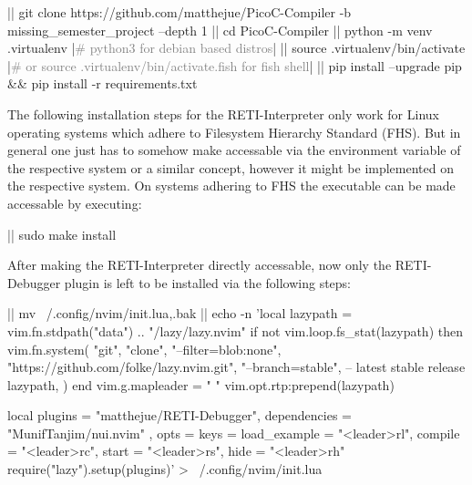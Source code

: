 \documentclass{report}
\begin{document}
\begin{terminal}
|\prompt| git clone https://github.com/matthejue/PicoC-Compiler
   -b missing_semester_project --depth 1
|\prompt| cd PicoC-Compiler
|\prompt| python -m venv .virtualenv |\textcolor{gray}{# python3 for debian based distros}|
|\prompt| source .virtualenv/bin/activate
|\textcolor{gray}{# or source .virtualenv/bin/activate.fish for fish shell}|
|\prompt| pip install --upgrade pip && pip install -r requirements.txt
\end{terminal}

The following installation steps for the RETI-Interpreter only work for Linux operating systems which adhere to \alert{Filesystem Hierarchy Standard} (FHS). But in general one just has to somehow make  accessable via the  environment variable of the respective system or a similar concept, however it might be implemented on the respective system. On systems adhering to FHS the executable can be made accessable by executing:

\begin{terminal}
  |\prompt| sudo make install
\end{terminal}

After making the RETI-Interpreter directly accessable, now only the RETI-Debugger plugin is left to be installed via the following steps:

\begin{terminal}
  |\prompt| mv ~/.config/nvim/init.lua{,.bak}
  |\prompt| echo -n 'local lazypath = vim.fn.stdpath("data") .. "/lazy/lazy.nvim"
  if not vim.loop.fs_stat(lazypath) then
    vim.fn.system({
      "git",
      "clone",
      "--filter=blob:none",
      "https://github.com/folke/lazy.nvim.git",
      "--branch=stable", -- latest stable release
      lazypath,
    })
  end
  vim.g.mapleader = " "
  vim.opt.rtp:prepend(lazypath)
\end{terminal}
\begin{terminal}
  local plugins = {
    {
      "matthejue/RETI-Debugger",
      dependencies = { "MunifTanjim/nui.nvim" },
      opts = {
          keys = {
            load_example = "<leader>rl",
            compile = "<leader>rc",
            start = "<leader>rs",
            hide = "<leader>rh"
          }
      }
    }
  }
  require("lazy").setup(plugins)' > ~/.config/nvim/init.lua
\end{terminal}
\end{document}
